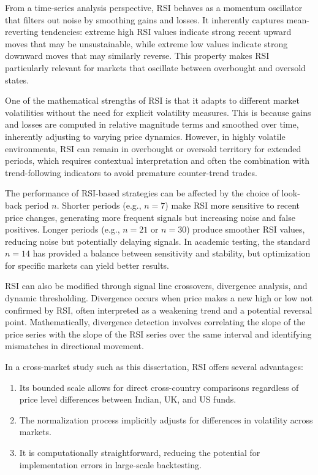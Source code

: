 From a time-series analysis perspective, RSI behaves as a momentum oscillator that filters out noise by smoothing gains and losses. It inherently captures mean-reverting tendencies: extreme high RSI values indicate strong recent upward moves that may be unsustainable, while extreme low values indicate strong downward moves that may similarly reverse. This property makes RSI particularly relevant for markets that oscillate between overbought and oversold states.

One of the mathematical strengths of RSI is that it adapts to different market volatilities without the need for explicit volatility measures. This is because gains and losses are computed in relative magnitude terms and smoothed over time, inherently adjusting to varying price dynamics. However, in highly volatile environments, RSI can remain in overbought or oversold territory for extended periods, which requires contextual interpretation and often the combination with trend-following indicators to avoid premature counter-trend trades.

The performance of RSI-based strategies can be affected by the choice of look-back period $n$. Shorter periods (e.g., $n=7$) make RSI more sensitive to recent price changes, generating more frequent signals but increasing noise and false positives. Longer periods (e.g., $n=21$ or $n=30$) produce smoother RSI values, reducing noise but potentially delaying signals. In academic testing, the standard $n=14$ has provided a balance between sensitivity and stability, but optimization for specific markets can yield better results.

RSI can also be modified through signal line crossovers, divergence analysis, and dynamic thresholding. Divergence occurs when price makes a new high or low not confirmed by RSI, often interpreted as a weakening trend and a potential reversal point. Mathematically, divergence detection involves correlating the slope of the price series with the slope of the RSI series over the same interval and identifying mismatches in directional movement.

In a cross-market study such as this dissertation, RSI offers several advantages:
\begin{enumerate}
    \item Its bounded scale allows for direct cross-country comparisons regardless of price level differences between Indian, UK, and US funds.
    \item The normalization process implicitly adjusts for differences in volatility across markets.
    \item It is computationally straightforward, reducing the potential for implementation errors in large-scale backtesting.
\end{enumerate}





